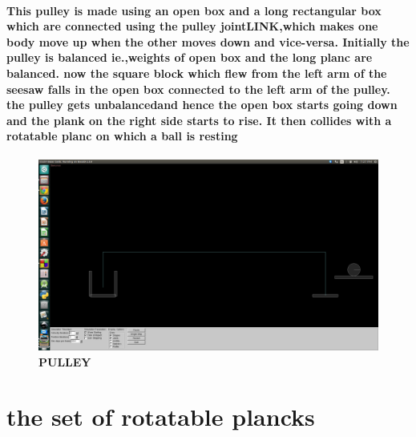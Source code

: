 \paragraph{
This pulley is made using an open box and a long rectangular box which are connected using the pulley joint\textbf{LINK},which makes one body move up when the other moves down and vice-versa.
Initially the pulley is balanced ie.,weights of open box and the long planc are balanced.
now the square block which flew from the left arm of the seesaw falls in the open box connected to the left arm of the pulley.
the pulley gets unbalancedand hence the open box starts going down and the plank on the right side starts to rise.
It then collides with a rotatable planc on which a ball is resting
}
\begin{figure}[H]
  \centering
    \includegraphics[scale=0.2]{project/images/pulley2.png}
  \caption{\textbf{PULLEY}}
\end{figure}


\section{the set of rotatable plancks}
